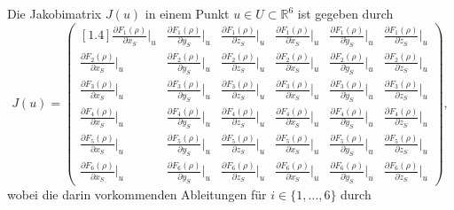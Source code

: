 \documentclass[a4paper,12pt]{article}
\numberwithin{equation}{section}
\begin{document}
Die Jakobimatrix $J(u)$ in einem Punkt $u \in U \subset \mathbb{R}^6$ ist gegeben durch
\begin{equation}\label{eq:jacobi}
J(u) = \begin{pmatrix}[1.4]
\tfrac{\partial F_1(\rho)}{\partial x_S}\big|_{u} & \tfrac{\partial F_1(\rho)}{\partial y_S}\big|_{u} & \tfrac{\partial F_1(\rho)}{\partial z_S}\big|_{u} & \tfrac{\partial F_1(\rho)}{\partial \dot{x}_S}\big|_{u} & \tfrac{\partial F_1(\rho)}{\partial \dot{y}_S}\big|_{u} & \tfrac{\partial F_1(\rho)}{\partial \dot{z}_S}\big|_{u} \\
\tfrac{\partial F_2(\rho)}{\partial x_S}\big|_{u} & \tfrac{\partial F_2(\rho)}{\partial y_S}\big|_{u} & \tfrac{\partial F_2(\rho)}{\partial z_S}\big|_{u} & \tfrac{\partial F_2(\rho)}{\partial \dot{x}_S}\big|_{u} & \tfrac{\partial F_2(\rho)}{\partial \dot{y}_S}\big|_{u} & \tfrac{\partial F_2(\rho)}{\partial \dot{z}_S}\big|_{u} \\
\tfrac{\partial F_3(\rho)}{\partial x_S}\big|_{u} & \tfrac{\partial F_3(\rho)}{\partial y_S}\big|_{u} & \tfrac{\partial F_3(\rho)}{\partial z_S}\big|_{u} & \tfrac{\partial F_3(\rho)}{\partial \dot{x}_S}\big|_{u} & \tfrac{\partial F_3(\rho)}{\partial \dot{y}_S}\big|_{u} & \tfrac{\partial F_3(\rho)}{\partial \dot{z}_S}\big|_{u} \\
\tfrac{\partial F_4(\rho)}{\partial x_S}\big|_{u} & \tfrac{\partial F_4(\rho)}{\partial y_S}\big|_{u} & \tfrac{\partial F_4(\rho)}{\partial z_S}\big|_{u} & \tfrac{\partial F_4(\rho)}{\partial \dot{x}_S}\big|_{u} & \tfrac{\partial F_4(\rho)}{\partial \dot{y}_S}\big|_{u} & \tfrac{\partial F_4(\rho)}{\partial \dot{z}_S}\big|_{u} \\
\tfrac{\partial F_5(\rho)}{\partial x_S}\big|_{u} & \tfrac{\partial F_5(\rho)}{\partial y_S}\big|_{u} & \tfrac{\partial F_5(\rho)}{\partial z_S}\big|_{u} & \tfrac{\partial F_5(\rho)}{\partial \dot{x}_S}\big|_{u} & \tfrac{\partial F_5(\rho)}{\partial \dot{y}_S}\big|_{u} & \tfrac{\partial F_5(\rho)}{\partial \dot{z}_S}\big|_{u} \\
\tfrac{\partial F_6(\rho)}{\partial x_S}\big|_{u} & \tfrac{\partial F_6(\rho)}{\partial y_S}\big|_{u} & \tfrac{\partial F_6(\rho)}{\partial z_S}\big|_{u} & \tfrac{\partial F_6(\rho)}{\partial \dot{x}_S}\big|_{u} & \tfrac{\partial F_6(\rho)}{\partial \dot{y}_S}\big|_{u} & \tfrac{\partial F_6(\rho)}{\partial \dot{z}_S}\big|_{u} 
\end{pmatrix},
\end{equation} wobei die darin vorkommenden Ableitungen für $i \in \{1,\dots,6\}$ durch
\end{document}
